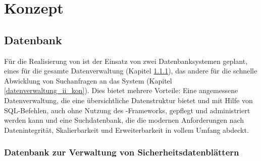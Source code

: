 \chapter{Konzept}
\label{konzept_kon}

\section{Datenbank}
\label{datenbank_kon}

Für die Realisierung von  ist der Einsatz von zwei Datenbanksystemen
geplant, eines für die gesamte
Datenverwaltung (Kapitel \ref{datenverwaltung_i_kon}), das andere
für die schnelle Abwicklung von Suchanfragen an das System (Kapitel
\ref{datenverwaltung_ii_kon}). Dies bietet mehrere Vorteile: Eine angemessene
Datenverwaltung, die eine übersichtliche Datenstruktur bietet und mit Hilfe von
\ac{SQL}-Befehlen, auch ohne Nutzung des -Frameworks, gepflegt und
administriert werden kann und eine Suchdatenbank, die die modernen Anforderungen
nach Datenintegrität, Skalierbarkeit und Erweiterbarkeit in vollem Umfang
abdeckt.

\subsection{Datenbank zur Verwaltung von Sicherheitsdatenblättern}
\label{datenverwaltung_i_kon}

